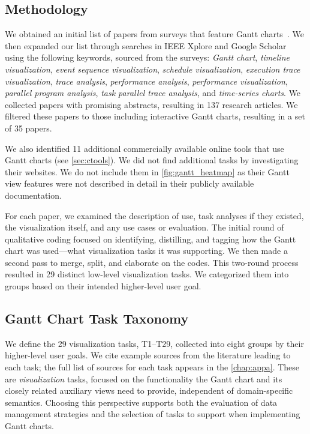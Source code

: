 \begin{refsection}
\subsection{Methodology}
\label{subsec:task_methods}
We obtained an initial list of papers from surveys that feature Gantt charts~\cite{isaacs2014state, guo2021survey, ezzati2017multi}. We then expanded our list through searches in IEEE Xplore and Google Scholar using the following keywords, sourced from the surveys: \textit{Gantt chart}, \textit{timeline visualization}, \textit{event sequence visualization}, \textit{schedule visualization}, \textit{execution trace visualization}, \textit{trace analysis}, \textit{performance analysis}, \textit{performance visualization}, \textit{parallel program analysis}, \textit{task parallel trace analysis}, and \textit{time-series charts}. We collected papers with promising abstracts, resulting in 137 research articles. We filtered these papers to those including interactive Gantt charts, resulting in a set of 35 papers. 

We also identified 11 additional commercially available online tools that use Gantt charts (see \autoref{sec:ctools}). We did not find additional tasks by investigating their websites. We do not include them in \autoref{fig:gantt_heatmap} as their Gantt view features were not described in detail in their publicly available documentation.

For each paper, we examined the description of use, task analyses if they existed, the visualization itself, and any use cases or evaluation. The initial round of qualitative coding focused on identifying, distilling, and tagging how the Gantt chart was used---what visualization tasks it was supporting. We then made a second pass to merge, split, and elaborate on the codes. This two-round process resulted in 29 distinct low-level visualization tasks. We categorized them into groups based on their intended higher-level user goal.

\subsection{Gantt Chart Task Taxonomy}
\label{subsec:tasks}
We define the 29 visualization tasks, T1--T29, collected into eight groups by their higher-level user goals. We cite example sources from the literature leading to each task; the full list of sources for each task appears in the \autoref{chap:appa}. These are \emph{visualization} tasks, focused on the functionality the Gantt chart and its closely related auxiliary views need to provide, independent of domain-specific semantics. Choosing this perspective supports both the evaluation of data management strategies and the selection of tasks to support when implementing Gantt charts.


\end{refsection}
